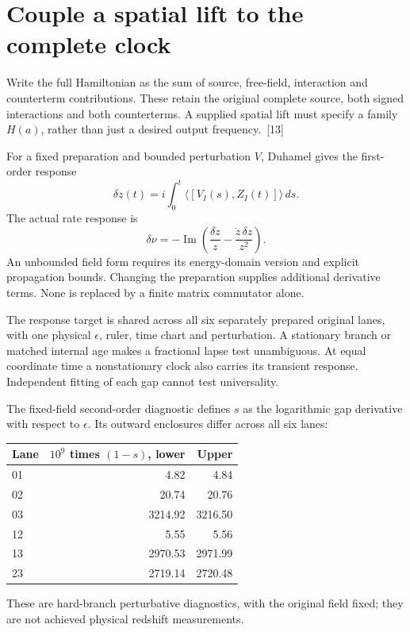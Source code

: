 \documentclass[10pt,twocolumn,letterpaper]{article}
\begin{document}
\section{Couple a spatial lift to the complete clock}
Write the full Hamiltonian as the sum of source, free-field, interaction and counterterm contributions. These retain the original complete source, both signed interactions and both counterterms. A supplied spatial lift must specify a family \(H(a)\), rather than just a desired output frequency.~[13]

For a fixed preparation and bounded perturbation \(V\), Duhamel gives the first-order response
\[
\delta z(t)=i\int_0^t\langle[V_I(s),Z_I(t)]\rangle\,ds.
\]
The actual rate response is
\[
\delta\nu=-\operatorname{Im}\left(\frac{\delta\dot z}{z}-\frac{\dot z\,\delta z}{z^2}\right).
\]
An unbounded field form requires its energy-domain version and explicit propagation bounds. Changing the preparation supplies additional derivative terms. None is replaced by a finite matrix commutator alone.

The response target is shared across all six separately prepared original lanes, with one physical \(\epsilon\), ruler, time chart and perturbation. A stationary branch or matched internal age makes a fractional lapse test unambiguous. At equal coordinate time a nonstationary clock also carries its transient response. Independent fitting of each gap cannot test universality.

The fixed-field second-order diagnostic defines \(s\) as the logarithmic gap derivative with respect to \(\epsilon\). Its outward enclosures differ across all six lanes:
\begin{center}
\begin{tabular}{@{}lrr@{}}
\toprule
Lane & \(10^9\) times \((1-s)\), lower & Upper \\
\midrule
01 & 4.82 & 4.84 \\
02 & 20.74 & 20.76 \\
03 & 3214.92 & 3216.50 \\
12 & 5.55 & 5.56 \\
13 & 2970.53 & 2971.99 \\
23 & 2719.14 & 2720.48 \\
\bottomrule
\end{tabular}
\end{center}
These are hard-branch perturbative diagnostics, with the original field fixed; they are not achieved physical redshift measurements.
\end{document}
